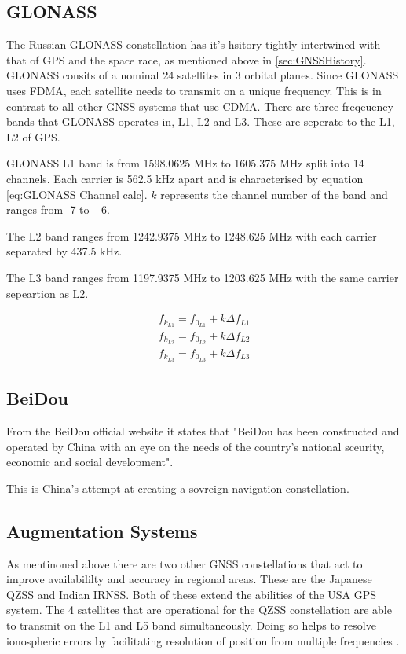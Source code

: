 \subsection{GLONASS} \label{subsec:GNSS_GLONASSIntro}
The Russian GLONASS constellation has it's hsitory tightly intertwined with that of GPS and the space race, as mentioned above in \ref{sec:GNSSHistory}.
GLONASS consits of a nominal 24 satellites in 3 orbital planes. Since GLONASS uses FDMA, each satellite needs to transmit on a unique frequency. This is in contrast to
all other GNSS systems that use CDMA. There are three freqeuency bands that GLONASS operates in, L1, L2 and L3. These are seperate to the L1, L2 of GPS. 

GLONASS L1 band is from 1598.0625 MHz to 1605.375 MHz split into 14 channels. Each carrier is 562.5 kHz apart and is characterised by equation \ref{eq:GLONASS Channel
calc}. $k$ represents the channel number of the band and ranges from -7 to +6. 

The L2 band ranges from 1242.9375 MHz to 1248.625 MHz with each carrier separated by 437.5 kHz.

The L3 band ranges from 1197.9375 MHz to 1203.625 MHz with the same carrier sepeartion as L2.

\begin{equation} 
    \begin{split} \label{eq:GLONASS Channel calc}
        f_{k_{L1}} = f_{0_{L1}} + k \Delta f_{L1} \\ 
        f_{k_{L2}} = f_{0_{L2}} + k \Delta f_{L2} \\ 
        f_{k_{L3}} = f_{0_{L3}} + k \Delta f_{L3}
    \end{split}
\end{equation}

\subsection{BeiDou} \label{subsec:GNSS_BeiDouIntro}
From the BeiDou official website it states that "BeiDou has been constructed and operated by China with an eye on the needs of the country's national sceurity, economic
and social development".

This is China's attempt at creating a sovreign navigation constellation.

\subsection{Augmentation Systems} \label{subsec:GNSS_OtherIntro}
As mentinoned above there are two other GNSS constellations that act to improve availabililty and accuracy in regional areas. These are the Japanese QZSS and Indian
IRNSS. Both of these extend the abilities of the USA GPS system. The 4 satellites that are operational for the QZSS constellation are able to transmit on the L1 and L5
band  simultaneously. Doing so helps to resolve ionospheric errors by facilitating resolution of position from multiple frequencies \cite{RN48}.

